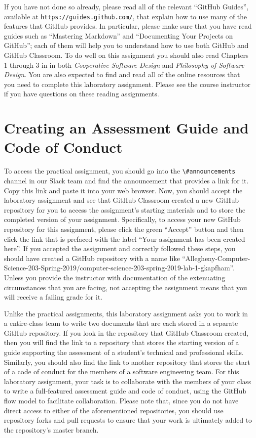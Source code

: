 \documentclass[11pt]{article}
\newcommand{\cooperative}{{\em Cooperative Software Design\/}}
\newcommand{\philosophy}{{\em Philosophy of Software Design\/}}
\newcommand{\url}[1]{\lstinline{#1}}
\newcommand{\channel}[1]{\lstinline{#1}}
\begin{document}
If you have not done so already, please read all of the relevant ``GitHub
Guides'', available at \url{https://guides.github.com/}, that explain how to use
many of the features that GitHub provides. In particular, please make sure that
you have read guides such as ``Mastering Markdown'' and ``Documenting Your
Projects on GitHub''; each of them will help you to understand how to use both
GitHub and GitHub Classroom.
%
To do well on this assignment you should also read Chapters 1 through 3 in in
both \cooperative{} and \philosophy{}.
%
You are also expected to find and read all of the online resources that you need
to complete this laboratory assignment.
%
Please see the course instructor if you have questions on these reading
assignments.

\section*{Creating an Assessment Guide and Code of Conduct}


To access the practical assignment, you should go into the
\channel{\#announcements} channel in our Slack team and find the announcement
that provides a link for it. Copy this link and paste it into your web browser.
Now, you should accept the laboratory assignment and see that GitHub Classroom
created a new GitHub repository for you to access the assignment's starting
materials and to store the completed version of your assignment. Specifically,
to access your new GitHub repository for this assignment, please click the green
``Accept'' button and then click the link that is prefaced with the label ``Your
assignment has been created here''. If you accepted the assignment and correctly
followed these steps, you should have created a GitHub repository with a name
like
``Allegheny-Computer-Science-203-Spring-2019/computer-science-203-spring-2019-lab-1-gkapfham''.
Unless you provide the instructor with documentation of the extenuating
circumstances that you are facing, not accepting the assignment means that you
will receive a failing grade for it.


Unlike the practical assignments, this laboratory assignment asks you to work in
a entire-class team to write two documents that are each stored in a separate
GitHub repository. If you look in the repository that GitHub Classroom created,
then you will find the link to a repository that stores the starting version of
a guide supporting the assessment of a student's technical and professional
skills. Similarly, you should also find the link to another repository that
stores the start of a code of conduct for the members of a software engineering
team. For this laboratory assignment, your task is to collaborate with the
members of your class to write a full-featured assessment guide and code of
conduct, using the GitHub flow model to facilitate collaboration. Please note
that, since you do not have direct access to either of the aforementioned
repositories, you should use repository forks and pull requests to ensure that
your work is ultimately added to the repository's master branch.
\end{document}
